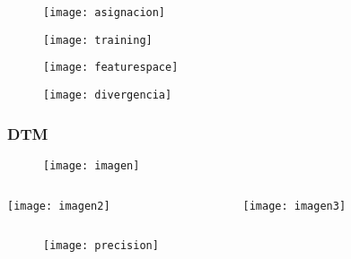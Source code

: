 \documentclass[14pt]{beamer}
\begin{document}
\begin{frame}
  \begin{figure}
    \centering
    \texttt{[image: asignacion]}
  \end{figure}
\tiny{}
\end{frame}
\begin{frame}
  \begin{figure}
    \centering
    \texttt{[image: training]}
  \end{figure}
\tiny{}
\end{frame}
\begin{frame}
  \begin{figure}
    \centering
    \texttt{[image: featurespace]}
  \end{figure}
\tiny{}
\end{frame}
\begin{frame}
  \begin{figure}
    \centering
    \texttt{[image: divergencia]}
  \end{figure}
\tiny{}
\end{frame}
\begin{frame}
\frametitle{DTM}
  \begin{figure}
    \centering
    \texttt{[image: imagen]}
   \end{figure}
\begin{columns}
		\begin{column}{.49\linewidth}
		 \texttt{[image: imagen2]}
		\end{column}
		\begin{column}{.49\linewidth}
			 \texttt{[image: imagen3]}
		\end{column}
	\end{columns}
\end{frame}
\begin{frame}
  \begin{figure}
    \centering
    \texttt{[image: precision]}
  \end{figure}
\tiny{}
\end{frame}
\end{document}
